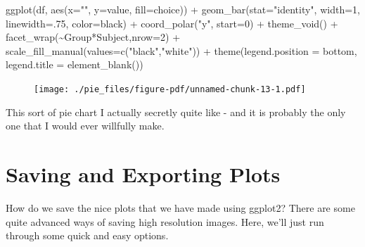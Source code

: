 \documentclass[
  letterpaper,
  DIV=11,
  numbers=noendperiod]{scrreprt}
\newenvironment{Shaded}{\begin{snugshade}}{\end{snugshade}}
\newcommand{\AttributeTok}[1]{\textcolor[rgb]{0.40,0.45,0.13}{#1}}
\newcommand{\DecValTok}[1]{\textcolor[rgb]{0.68,0.00,0.00}{#1}}
\newcommand{\FunctionTok}[1]{\textcolor[rgb]{0.28,0.35,0.67}{#1}}
\newcommand{\NormalTok}[1]{\textcolor[rgb]{0.00,0.23,0.31}{#1}}
\newcommand{\SpecialCharTok}[1]{\textcolor[rgb]{0.37,0.37,0.37}{#1}}
\newcommand{\StringTok}[1]{\textcolor[rgb]{0.13,0.47,0.30}{#1}}
\begin{document}
\begin{Shaded}
\begin{Highlighting}[]
\FunctionTok{ggplot}\NormalTok{(df, }\FunctionTok{aes}\NormalTok{(}\AttributeTok{x=}\StringTok{""}\NormalTok{, }\AttributeTok{y=}\NormalTok{value, }\AttributeTok{fill=}\NormalTok{choice)) }\SpecialCharTok{+}
  \FunctionTok{geom\_bar}\NormalTok{(}\AttributeTok{stat=}\StringTok{"identity"}\NormalTok{, }\AttributeTok{width=}\DecValTok{1}\NormalTok{, }\AttributeTok{linewidth=}\NormalTok{.}\DecValTok{75}\NormalTok{, }\AttributeTok{color=}\StringTok{\textquotesingle{}black\textquotesingle{}}\NormalTok{) }\SpecialCharTok{+}
  \FunctionTok{coord\_polar}\NormalTok{(}\StringTok{"y"}\NormalTok{, }\AttributeTok{start=}\DecValTok{0}\NormalTok{) }\SpecialCharTok{+}
  \FunctionTok{theme\_void}\NormalTok{() }\SpecialCharTok{+}
  \FunctionTok{facet\_wrap}\NormalTok{(}\SpecialCharTok{\textasciitilde{}}\NormalTok{Group}\SpecialCharTok{*}\NormalTok{Subject,}\AttributeTok{nrow=}\DecValTok{2}\NormalTok{) }\SpecialCharTok{+}
  \FunctionTok{scale\_fill\_manual}\NormalTok{(}\AttributeTok{values=}\FunctionTok{c}\NormalTok{(}\StringTok{"black"}\NormalTok{,}\StringTok{"white"}\NormalTok{)) }\SpecialCharTok{+}
  \FunctionTok{theme}\NormalTok{(}\AttributeTok{legend.position =} \StringTok{\textquotesingle{}bottom\textquotesingle{}}\NormalTok{,}
        \AttributeTok{legend.title =} \FunctionTok{element\_blank}\NormalTok{())}
\end{Highlighting}
\end{Shaded}

\begin{figure}[H]

{\centering \texttt{[image: ./pie\_files/figure-pdf/unnamed-chunk-13-1.pdf]}

}

\end{figure}

This sort of pie chart I actually secretly quite like - and it is
probably the only one that I would ever willfully make.


\hypertarget{saving-and-exporting-plots}{%
\chapter{Saving and Exporting Plots}\label{saving-and-exporting-plots}}

How do we save the nice plots that we have made using ggplot2? There are
some quite advanced ways of saving high resolution images. Here, we'll
just run through some quick and easy options.
\end{document}
